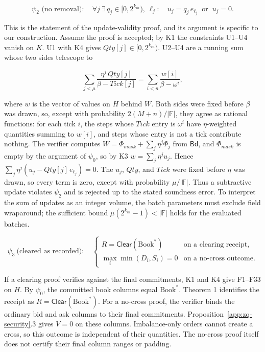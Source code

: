 \[\psi_2 \text{ (no removal)}:\quad \forall j\ \exists\, q_j \in [0, 2^{k_{in}}),\ \ell_j:\quad u_j = q_j\, e_{\ell_j} \ \text{ or } \ u_j = 0.\]

This is the statement of the update-validity proof, and its argument is specific to our construction. Assume the proof is accepted; by K1 the constraints U1--U4 vanish on \(K\). U1 with K4 gives \(Qty[j] \in [0, 2^{k_{in}})\). U2--U4 are a running sum whose two sides telescope to

\[\sum_{j<\mu} \frac{\eta^j\, Qty[j]}{\beta - Tick[j]} = \sum_{i<n} \frac{w[i]}{\beta - \omega^i},\]

where \(w\) is the vector of values on \(H\) behind \(W\). Both sides were fixed before \(\beta\) was drawn, so, except with probability \(2(M+n)/|\mathbb{F}|\), they agree as rational functions: for each tick \(i\), the steps whose \(Tick\) entry is \(\omega^i\) have \(\eta\)-weighted quantities summing to \(w[i]\), and steps whose entry is not a tick contribute nothing. The verifier computes \(W = \Phi_{mask} + \sum_j \eta^j \Phi_j\) from \(\mathsf{Bd}\), and \(\Phi_{mask}\) is empty by the argument of \(\psi_0\), so by K3 \(w = \sum_j \eta^j u_j\). Hence \(\sum_j \eta^j (u_j - Qty[j]\, e_{\ell_j}) = 0\). The \(u_j\), \(Qty\), and \(Tick\) were fixed before \(\eta\) was drawn, so every term is zero, except with probability \(\mu/|\mathbb{F}|\). Thus a subtractive update violates \(\psi_2\) and is rejected up to the stated soundness error. To interpret the sum of updates as an integer volume, the batch parameters must exclude field wraparound; the sufficient bound \(\mu(2^{k_{in}}-1)<|\mathbb F|\) holds for the evaluated batches.

\[
\psi_3\ \text{(cleared as recorded)}:\quad
\begin{cases}
 R=\mathsf{Clear}(\text{Book}^*) & \text{on a clearing receipt},\\
 \max_i\min(D_i,S_i)=0 & \text{on a no-cross outcome}.
\end{cases}
\]

If a clearing proof verifies against the final commitments, K1 and K4 give F1--F33 on \(H\). By \(\psi_0\), the committed book columns equal \(\text{Book}^*\). Theorem 1 identifies the receipt as \(R=\mathsf{Clear}(\text{Book}^*)\). For a no-cross proof, the verifier binds the ordinary bid and ask columns to their final commitments. Proposition~\ref{app:zq-security}.3 gives \(V=0\) on these columns. Imbalance-only orders cannot create a cross, so this outcome is independent of their quantities. The no-cross proof itself does not certify their final column ranges or padding.

